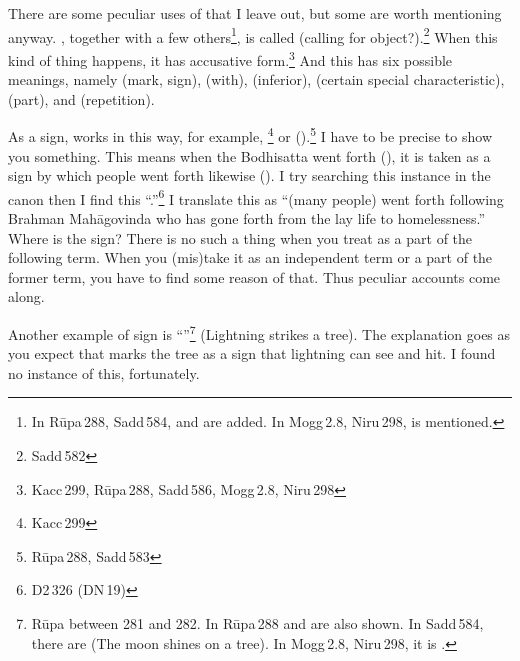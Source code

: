There are some peculiar uses of  that I leave out, but some are worth mentioning anyway. , together with a few others\footnote{In R\=upa\,288, Sadd\,584,  and  are added. In Mogg\,2.8, Niru\,298,  is mentioned.}, is called  (calling for object?).\footnote{Sadd\,582} When this kind of thing happens, it has accusative form.\footnote{Kacc\,299, R\=upa\,288, Sadd\,586, Mogg\,2.8, Niru\,298} And this has six possible meanings, namely  (mark, sign),  (with),  (inferior),  (certain special characteristic),  (part), and  (repetition).

As a sign,  works in this way, for example, \footnote{Kacc\,299} or  ().\footnote{R\=upa\,288, Sadd\,583} I have to be precise to show you something. This means when the Bodhisatta went forth (), it is taken as a sign by which people went forth likewise (). I try searching this instance in the canon then I find this ``.''\footnote{D2\,326 (DN\,19)} I translate this as ``(many people) went forth following Brahman Mah\=agovinda who has gone forth from the lay life to homelessness.'' Where is the sign? There is no such a thing when you treat  as a part of the following term. When you (mis)take it as an independent term or a part of the former term, you have to find some reason of that. Thus peculiar accounts come along.

Another example of sign is ``''\footnote{R\=upa between 281 and 282. In R\=upa\,288  and  are also shown. In Sadd\,584, there are  (The moon shines on a tree). In Mogg\,2.8, Niru\,298, it is .} (Lightning strikes a tree). The explanation goes as you expect that  marks the tree as a sign that lightning can see and hit. I found no instance of this, fortunately.

